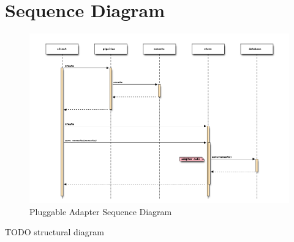    \section{Sequence Diagram}
	   \begin{figure}[H]
	   	\includegraphics[width = 1.2\linewidth]{diagrams/sequence_diagram.png}
	   	\caption{Pluggable Adapter Sequence Diagram}
	   \end{figure}

TODO structural diagram
